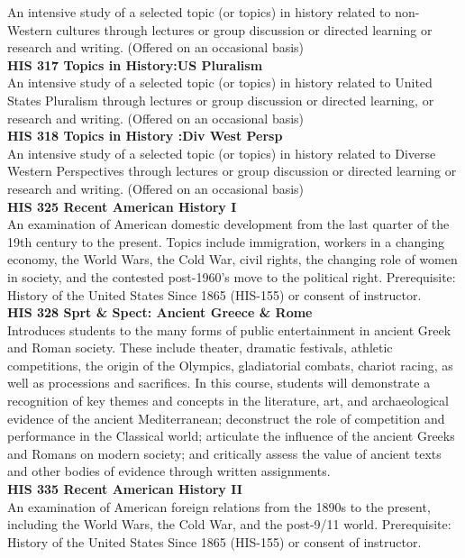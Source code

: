 \documentclass[
  letterpaper,
]{scrbook}
\begin{document}
An intensive study of a selected topic (or topics) in history related to
non-Western cultures through lectures or group discussion or directed
learning or research and writing. (Offered on an occasional basis)\\
\textbf{HIS 317 Topics in History:US Pluralism}\\
An intensive study of a selected topic (or topics) in history related to
United States Pluralism through lectures or group discussion or directed
learning, or research and writing. (Offered on an occasional basis)\\
\textbf{HIS 318 Topics in History :Div West Persp}\\
An intensive study of a selected topic (or topics) in history related to
Diverse Western Perspectives through lectures or group discussion or
directed learning or research and writing. (Offered on an occasional
basis)\\
\textbf{HIS 325 Recent American History I}\\
An examination of American domestic development from the last quarter of
the 19th century to the present. Topics include immigration, workers in
a changing economy, the World Wars, the Cold War, civil rights, the
changing role of women in society, and the contested post-1960's move to
the political right. Prerequisite: History of the United States Since
1865 (HIS-155) or consent of instructor.\\
\textbf{HIS 328 Sprt \& Spect: Ancient Greece \& Rome}\\
Introduces students to the many forms of public entertainment in ancient
Greek and Roman society. These include theater, dramatic festivals,
athletic competitions, the origin of the Olympics, gladiatorial combats,
chariot racing, as well as processions and sacrifices. In this course,
students will demonstrate a recognition of key themes and concepts in
the literature, art, and archaeological evidence of the ancient
Mediterranean; deconstruct the role of competition and performance in
the Classical world; articulate the influence of the ancient Greeks and
Romans on modern society; and critically assess the value of ancient
texts and other bodies of evidence through written assignments.\\
\textbf{HIS 335 Recent American History II}\\
An examination of American foreign relations from the 1890s to the
present, including the World Wars, the Cold War, and the post-9/11
world. Prerequisite: History of the United States Since 1865 (HIS-155)
or consent of instructor.\\
\end{document}
